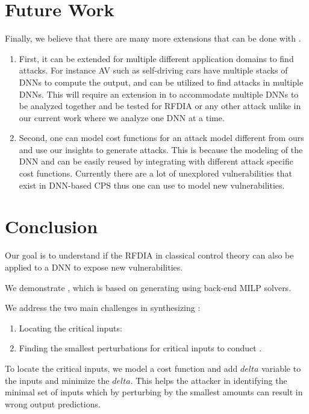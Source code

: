 \section{ Future Work}

Finally, we believe that there are many more extensions that can be done with \tool. 
\begin{enumerate}
	\item First, it can be extended for multiple different application domains to find attacks.
	For instance \ac{AV} such as self-driving cars have multiple stacks of \ac{DNN}s to compute the output, and \tool can be utilized to find attacks in multiple \ac{DNN}s. 
	This will require an extension in \tool to accommodate multiple \ac{DNN}s to be analyzed together and be tested for \ac{RFDIA} or any other attack unlike in our current work where we analyze one \ac{DNN} at a time. 
	\item Second, one can model cost functions for an attack model different from ours and use our insights to generate attacks. 
	This is because the modeling of the \ac{DNN} and \tool can be easily reused by integrating with different attack specific cost functions. 
	Currently there are a lot of unexplored vulnerabilities that exist in \ac{DNN}-based \ac*{CPS} thus one can use \tool to model new vulnerabilities. 
\end{enumerate}


\section{Conclusion}


Our goal is to understand if the  \ac*{RFDIA} in classical control theory can also be applied to a \ac{DNN} to expose new vulnerabilities.

We demonstrate \tool, which is based on generating \attack using back-end \ac{MILP} solvers. 

We address the two main challenges in synthesizing \attack: 
\begin{enumerate}
	\item Locating the critical inputs: 
	
	\item Finding the smallest perturbations for critical inputs to conduct \attack.
	
\end{enumerate}
To locate the critical inputs, we model a cost function and add $delta$ variable to the inputs and minimize the $delta$. 
This helps the attacker in identifying the minimal set of inputs which by perturbing by the smallest amounts can result in wrong output predictions. 

